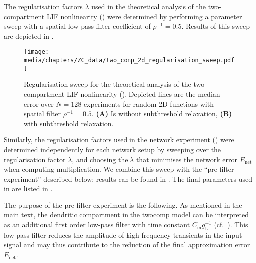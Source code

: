 The regularisation factors $\lambda$ used in the theoretical analysis of the two-compartment LIF nonlinearity () were determined by performing a parameter sweep with a spatial low-pass filter coefficient of $\rho^{-1} = 0.5$.
Results of this sweep are depicted in .
\begin{figure}
	\centering
	\texttt{[image: media/chapters/ZC\_data/two\_comp\_2d\_regularisation\_sweep.pdf]}
	\caption[Regularisation sweep for the theoretical analysis of the two-compartment LIF nonlinearity]{Regularisation sweep for the theoretical analysis of the two-compartment LIF nonlinearity (). Depicted lines are the median error over $N=128$ experiments for random 2D-functions with spatial filter $\rho^{-1} = 0.5$.
	\textbf{(A)} Is without subthreshold relaxation, \textbf{(B)} with subthreshold relaxation.}
	\label{fig:two_comp_2d_regularisation_sweep}
\end{figure}

Similarly, the regularisation factors used in the network experiment () were determined independently for each network setup by sweeping over the regularisation factor $\lambda$, and choosing the $\lambda$ that minimises the network error $E_\mathrm{net}$ when computing multiplication.
We combine this sweep with the \enquote{pre-filter experiment} described below; results can be found in .
The final parameters used in  are listed in .

The purpose of the pre-filter experiment is the following.
As mentioned in the main text, the dendritic compartment in the \gls{twocomp} model can be interpreted as an additional first order low-pass filter with time constant $C_\mathrm{m} g_\mathrm{L}^{-1}$ (cf.~).
This low-pass filter reduces the amplitude of high-frequency transients in the input signal and may thus contribute to the reduction of the final approximation error $E_\mathrm{net}$.

